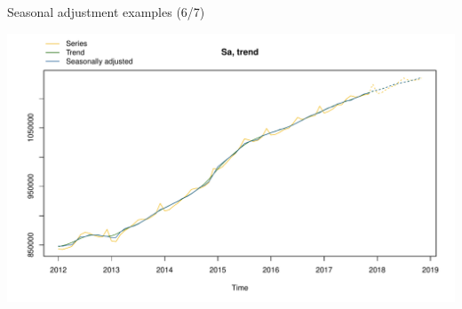 \documentclass[10pt,xcolor=table,color={dvipsnames,usenames},ignorenonframetext,usepdftitle=false,french]{beamer}
\newenvironment{Shaded}{\begin{snugshade}}{\end{snugshade}}
\newcommand{\KeywordTok}[1]{\textcolor[rgb]{0.13,0.29,0.53}{\textbf{#1}}}
\newcommand{\DataTypeTok}[1]{\textcolor[rgb]{0.13,0.29,0.53}{#1}}
\newcommand{\DecValTok}[1]{\textcolor[rgb]{0.00,0.00,0.81}{#1}}
\newcommand{\StringTok}[1]{\textcolor[rgb]{0.31,0.60,0.02}{#1}}
\newcommand{\OperatorTok}[1]{\textcolor[rgb]{0.81,0.36,0.00}{\textbf{#1}}}
\newcommand{\NormalTok}[1]{#1}
\begin{document}
\begin{frame}[fragile]{Seasonal adjustment examples (6/7)}

\begin{Shaded}
\end{Shaded}

\includegraphics{rjdemetra_files/figure-beamer/unnamed-chunk-11-1.pdf}

\end{frame}
\end{document}
